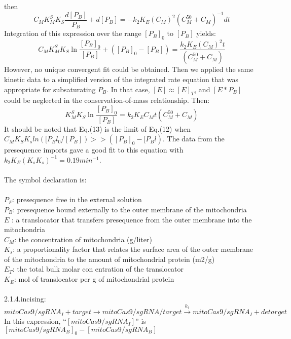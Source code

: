 \documentclass[UTF8]{ctexart}%
\begin{document}
then
\begin{equation}
C_MK_M^SK_S \frac{d[P_B]}{P_B}+d[P_B]=-k_2K_E(C_M)^2(C_M^{50}+C_M)^{-1} d t
\end{equation}
Integration of this expression over the range $[P_B]_0$ to $[P_B]$ yields:
\begin{equation}
C_MK_M^SK_S\ln\frac{[P_B]_0}{[P_B]}+([P_B]_0-[P_B])=\frac{k_2K_E(C_M)^2 t}{(C_M^{50}+C_M)}
\end{equation}
However, no unique convergent fit could be obtained. Then we applied the same kinetic data to a simplified version of the integrated rate equation that was appropriate for subsaturating $P_B$. In that case,  $[E] \approx [E]_T$, and $[E*P_B]$ could be neglected in the conservation-of-mass relationship. Then:
\begin{equation}
K_M^SK_S\ln\frac{[P_B]_0}{[P_B]}=k_2K_EC_Mt(C_M^{50}+C_M)
\end{equation}
It should be noted that Eq.(13) is the limit of Eq.(12) when $C_MK_S K_sln([P_Bl_0/[P_B]) >> ([P_B]_0 - [P_Bl)$. The data from the presequence imports gave a good fit to this equation with $k_2K_E(K_s K_s)^{-1} = 0.19 min^{-1}$.
	\\\\
	The symbol declaration is:\\\\
	$P_F$: presequence free in the external  solution\\
	$P_B$: presequence bound externally to the outer membrane of the mitochondria\\
	$E$ : a translocator that transfers presequence from the outer membrane into the mitochondria\\
	$C_M$: the concentration of mitochondria (g/liter)\\
	$K_s$: a proportionality factor that relates the surface area of the outer membrane of the mitochondria to the amount of mitochondrial protein (m2/g) \\
	$E_T$: the total bulk molar con entration of the translocator\\
	$K_E$: mol of translocator per g of mitochondrial protein
	\\\\ 
	2.1.4.incising:
	\begin{displaymath}
	mitoCas9/sgRNA_I+target\longrightarrow mitoCas9/sgRNA/target\stackrel{k_4} {\longrightarrow} mitoCas9/sgRNA_I+detarget
	\end{displaymath}
	In this expression, “$[mitoCas9/sgRNA_I]$” is $ [mitoCas9/sgRNA_B]_0-[mitoCas9/sgRNA_B]$ 
\end{document}
